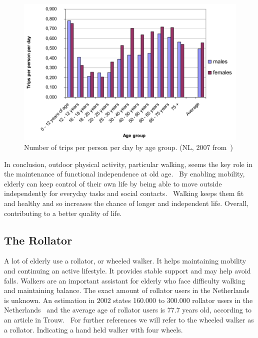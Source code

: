 \begin{figure}[h]
\includegraphics[width=\textwidth]{img/I3_numberOfTripsPerPersonPerDayByAge.pdf}
\centering
\caption[Number of trips per person per day by age group]{
Number of trips per person per day by age group. (NL, 2007 from~\cite{countryReport}) \label{percwalk}}
\end{figure}

In conclusion, outdoor physical activity, particular walking, seems the key role in the maintenance of functional independence at old age.~\cite{Rantakokko2009} By enabling mobility, elderly can keep control of their own life by being able to move outside independently for everyday tasks and social contacts.~\cite{MENSenSTRAAT2014} Walking keeps them fit and healthy and so increases the chance of longer and independent life. Overall, contributing to a better quality of life. 

\subsection{The Rollator}
A lot of elderly use a rollator, or wheeled walker. It helps maintaining mobility and continuing an active lifestyle. It provides stable support and may help avoid falls. Walkers are an important assistant for elderly who face difficulty walking and maintaining balance. The exact amount of rollator users in the Netherlands is unknown. An estimation in 2002 states 160.000 to 300.000 rollator users in the Netherlands~\cite{VeiligheidNL2012} and the average age of rollator users is 77.7 years old, according to an article in Trouw.~\cite{Trouw2003} 
For further references we will refer to the wheeled walker as a rollator. Indicating a hand held walker with four wheels. 


